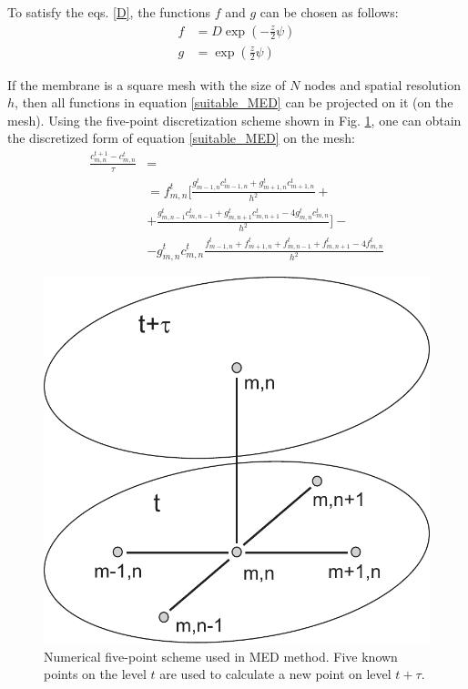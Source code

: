 To satisfy the eqs. \eqref{D}, the functions $f$ and $g$ can be chosen as follows:
\begin{align}
\label{f}
f&=D \exp(-\frac{z}{2}\psi) \\
\label{g}
g&=\exp(\frac{z}{2}\psi)
\end{align}

If the membrane is a square mesh with the size of $N$ nodes and spatial resolution $h$, then all functions in equation \eqref{suitable_MED} can be projected on it (on the mesh). Using the five-point discretization scheme shown in Fig. \ref{fig:computational_scheme}, one can obtain the discretized form of equation \eqref{suitable_MED} on the mesh:
\begin{align}
\label{discrete1}
\frac{c_{m,n}^{t+1} - c_{m,n}^{t}}{\tau} &= \nonumber \\
&= f_{m,n}^{t}\Big[ \frac{g_{m-1,n}^{t} c_{m-1,n}^{t} + g_{m+1,n}^{t} c_{m+1,n}^{t}}{h^2} + \nonumber \\
 &+ \frac{g_{m,n-1}^{t} c_{m,n-1}^{t} + g_{m,n+1}^{t} c_{m,n+1}^{t} - 4 g_{m,n}^{t} c_{m,n}^{t}}{h^2}\Big]- \nonumber \\
&- g_{m,n}^{t} c_{m,n}^{t} \frac{f_{m-1,n}^{t} + f_{m+1,n}^{t} + f_{m,n-1}^{t} + f_{m,n+1}^{t} - 4 f_{m,n}^{t}}{h^2}
\end{align}

\begin{figure}[!ht]
\centering
  \includegraphics[scale=0.5]{../figures/scheme.pdf}
\caption[Numerical five-point scheme used in MED method]{Numerical five-point scheme used in MED method. Five known points on the level $t$ are used to calculate a new point on level $t+\tau$.}
\label{fig:computational_scheme}
\end{figure}

